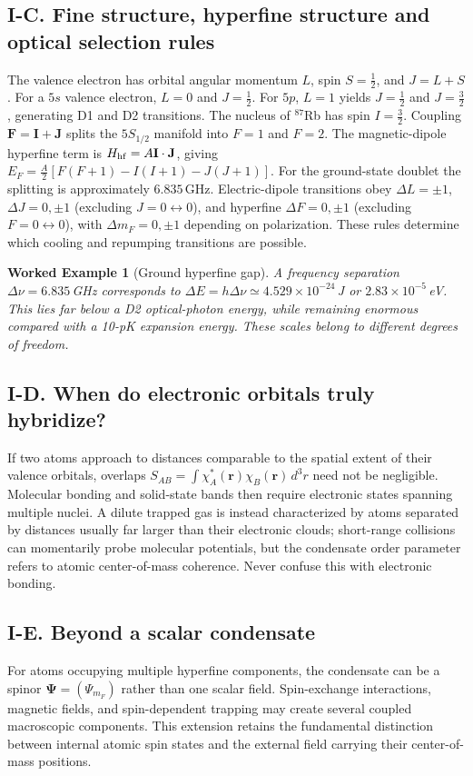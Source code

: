 \documentclass[11pt,a4paper]{article}
\newtheorem{example}{Worked Example}
\begin{document}
\subsection*{I-C. Fine structure, hyperfine structure and optical selection rules}
The valence electron has orbital angular momentum $L$, spin $S=\tfrac12$, and $J=L+S$. For a $5s$ valence electron, $L=0$ and $J=\tfrac12$. For $5p$, $L=1$ yields $J=\tfrac12$ and $J=\tfrac32$, generating D1 and D2 transitions. The nucleus of $^{87}$Rb has spin $I=\tfrac32$. Coupling $\mathbf F=\mathbf I+\mathbf J$ splits the $5S_{1/2}$ manifold into $F=1$ and $F=2$. The magnetic-dipole hyperfine term is $H_{\rm hf}=A\mathbf I\cdot\mathbf J$, giving $E_F=\tfrac A2[F(F+1)-I(I+1)-J(J+1)]$. For the ground-state doublet the splitting is approximately $6.835\,$GHz. Electric-dipole transitions obey $\Delta L=\pm1$, $\Delta J=0,\pm1$ (excluding $J=0\leftrightarrow0$), and hyperfine $\Delta F=0,\pm1$ (excluding $F=0\leftrightarrow0$), with $\Delta m_F=0,\pm1$ depending on polarization. These rules determine which cooling and repumping transitions are possible.
\begin{example}[Ground hyperfine gap]
A frequency separation $\Delta\nu=6.835\,$GHz corresponds to $\Delta E=h\Delta\nu\simeq4.529\times10^{-24}\,$J or $2.83\times10^{-5}\,$eV. This lies far below a D2 optical-photon energy, while remaining enormous compared with a 10-pK expansion energy. These scales belong to different degrees of freedom.
\end{example}
\subsection*{I-D. When do electronic orbitals truly hybridize?}
If two atoms approach to distances comparable to the spatial extent of their valence orbitals, overlaps $S_{AB}=\int\chi_A^*(\mathbf r)\chi_B(\mathbf r)\,d^3r$ need not be negligible. Molecular bonding and solid-state bands then require electronic states spanning multiple nuclei. A dilute trapped gas is instead characterized by atoms separated by distances usually far larger than their electronic clouds; short-range collisions can momentarily probe molecular potentials, but the condensate order parameter refers to atomic center-of-mass coherence. Never confuse this with electronic bonding.
\subsection*{I-E. Beyond a scalar condensate}
For atoms occupying multiple hyperfine components, the condensate can be a spinor $\boldsymbol\Psi=(\Psi_{m_F})$ rather than one scalar field. Spin-exchange interactions, magnetic fields, and spin-dependent trapping may create several coupled macroscopic components. This extension retains the fundamental distinction between internal atomic spin states and the external field carrying their center-of-mass positions.
\end{document}
